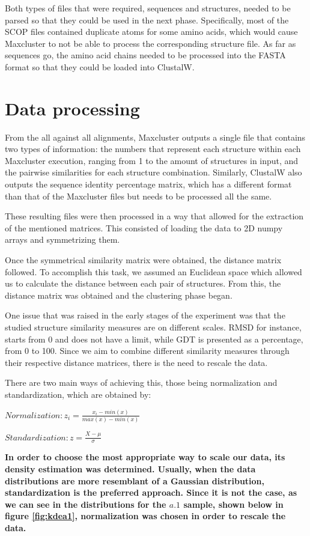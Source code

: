 Both types of files that were required, sequences and structures, needed to be parsed so that they could be used in the next phase. Specifically, most of the SCOP files contained duplicate atoms for some amino acids, which would cause Maxcluster to not be able to process the corresponding structure file. As far as sequences go, the amino acid chains needed to be processed into the FASTA format so that they could be loaded into ClustalW.

\chapter{Data processing} 

From the all against all alignments, Maxcluster outputs a single file that contains two types of information: the numbers that represent each structure within each Maxcluster execution, ranging from 1 to the amount of structures in input, and the pairwise similarities for each structure combination. Similarly, ClustalW also outputs the sequence identity percentage matrix, which has a different format than that of the Maxcluster files but needs to be processed all the same.

These resulting files were then processed in a way that allowed for the extraction of the mentioned matrices. This consisted of loading the data to 2D numpy arrays and symmetrizing them.

Once the symmetrical similarity matrix were obtained, the distance matrix followed. To accomplish this task, we assumed an Euclidean space which allowed us to calculate the distance between each pair of structures. From this, the distance matrix was obtained and the clustering phase began.

One issue that was raised in the early stages of the experiment was that the studied structure similarity measures are on different scales. RMSD for instance, starts from 0 and does not have a limit, while GDT is presented as a percentage, from 0 to 100. Since we aim to combine different similarity measures through their respective distance matrices, there is the need to rescale the data.

There are two main ways of achieving this, those being normalization and standardization, which are obtained by:

	 $Normalization: z_i = \frac{x_i - min(x)}{max(x)-min(x)}$

	 $Standardization: z = \frac{X - \mu}{\sigma}$

\textbf{In order to choose the most appropriate way to scale our data, its density estimation was determined. Usually, when the data distributions are more resemblant of a Gaussian distribution, standardization is the preferred approach. Since it is not the case, as we can see in the distributions for the $a.1$ sample, shown below in figure \ref{fig:kdea1}, normalization was chosen in order to rescale the data.}

